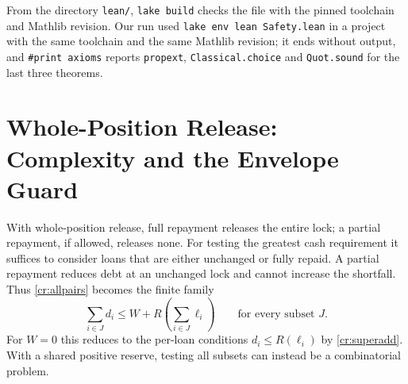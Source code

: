 From the directory \texttt{lean/}, \texttt{lake build} checks the file with the pinned toolchain and Mathlib revision. Our run used \texttt{lake env lean Safety.lean} in a project with the same toolchain and the same Mathlib revision; it ends without output, and \texttt{\#print axioms} reports \texttt{propext}, \texttt{Classical.choice} and \texttt{Quot.sound} for the last three theorems.

\section{Whole-Position Release: Complexity and the Envelope Guard}\label{cr:complexity}

With whole-position release, full repayment releases the entire lock; a partial repayment, if allowed, releases none. For testing the greatest cash requirement it suffices to consider loans that are either unchanged or fully repaid. A partial repayment reduces debt at an unchanged lock and cannot increase the shortfall. Thus \cref{cr:allpairs} becomes the finite family
\begin{equation}\label{cr:subsets}
\sum_{i\in J}d_i\le W+R\!\left(\sum_{i\in J}\ell_i\right)
\qquad\text{for every subset }J.
\end{equation}
For $W=0$ this reduces to the per-loan conditions $d_i\le R(\ell_i)$ by \eqref{cr:superadd}. With a shared positive reserve, testing all subsets can instead be a combinatorial problem.

